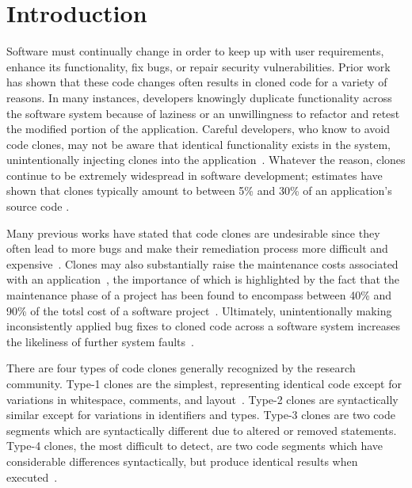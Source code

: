 \documentclass[smallextended]{svjour3}       %
\begin{document}
\section{Introduction}
Software must continually change in order to keep up with user requirements, enhance its functionality, fix bugs, or repair security vulnerabilities. Prior work has shown that these code changes often results in cloned code for a variety of reasons. In many instances, developers knowingly duplicate functionality across the software system because of laziness or an unwillingness to refactor and retest the modified portion of the application. Careful developers, who know to avoid code clones, may not be aware that identical functionality exists in the system, unintentionally injecting clones into the application~\cite{Duala-Ekoko:2010:CRD:1767751.1767754,Baker:1995:FDN:832303.836911,Kapser:2006:SAC:1133105.1133106,Li:2006:CFC:1128600.1128814}. Whatever the reason, clones continue to be extremely widespread in software development; estimates have shown that clones typically amount to between 5\% and 30\% of an application's source code \cite{Baxter:1998:CDU:850947.853341,Schulze:2010:CCF:1942788.1868310,Kim:2005:ESC:1095430.1081737}.

Many previous works have stated that code clones are undesirable since they often lead to more bugs and make their remediation process more difficult and expensive~\cite{Mondal:2012:ESC:2387358.2387360,Duala-Ekoko:2010:CRD:1767751.1767754,Baker:1995:FDN:832303.836911,Baxter:1998:CDU:850947.853341}. Clones may also substantially raise the maintenance costs associated with an application~\cite{Juergens:2009:CCM:1555001.1555062}, the importance of which is highlighted by the fact that the maintenance phase of a project has been found to encompass between 40\% and 90\% of the totsl cost of a software project~\cite{Shukla:2008:ESM:1342211.1342232,Ducasse:1999:LIA:519621.853389,SMR:SMR225,Ueda:2002:GMS:823457.824039,Boehm:2001:SDR:619059.621640,Erlikh:2000:LLS:612986.613032}. Ultimately, unintentionally making inconsistently applied bug fixes to cloned code across a software system increases the likeliness of further system faults~\cite{Deissenboeck_2010}.

There are four types of code clones generally recognized by the research community. Type-1 clones are the simplest, representing identical code except for variations in whitespace, comments, and layout~\cite{4288192}. Type-2 clones are syntactically similar except for variations in identifiers and types. Type-3 clones are two code segments which are syntactically different due to altered or removed statements. Type-4 clones, the most difficult to detect, are two code segments which have considerable differences syntactically, but produce identical results when executed~\cite{Gold:2010:ICC:1808901.1808916,Dang:2012:XTC:2420950.2421004}.
\end{document}
